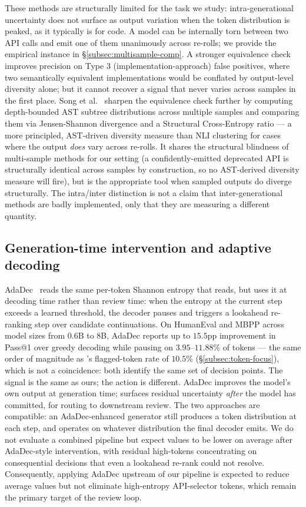 These methods are structurally limited for the task we study:
intra-generational uncertainty does not surface as output variation
when the token distribution is peaked, as it typically is for code.
A model can be internally torn between two API calls and emit one of
them unanimously across re-rolls; we provide the empirical instance
in \S\ref{subsec:multisample-comp}. A stronger equivalence check
improves precision on Type 3 (implementation-approach) false
positives, where two semantically equivalent implementations would
be conflated by output-level diversity alone; but it cannot recover
a signal that never varies across samples in the first place. Song
et al.~\cite{song2025structural} sharpen the equivalence check
further by computing depth-bounded AST subtree distributions across
multiple samples and comparing them via Jensen-Shannon divergence
and a Structural Cross-Entropy ratio --- a more principled, AST-driven
diversity measure than NLI clustering for cases where the output
\emph{does} vary across re-rolls. It shares the structural blindness
of multi-sample methods for our setting (a confidently-emitted
deprecated API is structurally identical across samples by
construction, so no AST-derived diversity measure will fire), but is
the appropriate tool when sampled outputs do diverge structurally.
The intra/inter distinction is not a claim that inter-generational
methods are badly implemented, only that they are measuring a
different quantity.

\subsection{Generation-time intervention and adaptive decoding}
\label{subsec:related-adadec}

AdaDec~\cite{adadec2025} reads the same per-token Shannon entropy
that \eps reads, but uses it at decoding time rather than review
time: when the entropy at the current step exceeds a learned
threshold, the decoder pauses and triggers a lookahead re-ranking
step over candidate continuations. On HumanEval and MBPP across
model sizes from $0.6$B to $8$B, AdaDec reports up to $15.5$pp
improvement in Pass@1 over greedy decoding while pausing on
$3.95$--$11.88\%$ of tokens --- the same order of magnitude as
\eps's flagged-token rate of $10.5\%$ (\S\ref{subsec:token-focus}),
which is not a coincidence: both identify the same set of decision
points. The signal is the same as ours; the action is different.
AdaDec improves the model's own output at generation time; \eps
surfaces residual uncertainty \emph{after} the model has committed,
for routing to downstream review. The two approaches are compatible:
an AdaDec-enhanced generator still produces a token distribution at
each step, and \eps operates on whatever distribution the final
decoder emits. We do not evaluate a combined pipeline but expect
\eps values to be lower on average after AdaDec-style intervention,
with residual high-\eps tokens concentrating on consequential
decisions that even a lookahead re-rank could not resolve.
Consequently, applying AdaDec upstream of our pipeline is expected to
reduce average \eps values but not eliminate high-entropy API-selector
tokens, which remain the primary target of the review loop.

